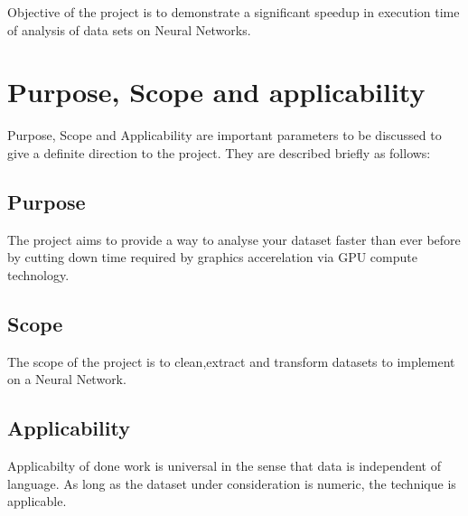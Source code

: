 \hspace{0.9cm} Objective of the project is to demonstrate a significant speedup in execution time of analysis of data sets on Neural Networks.

\section{Purpose, Scope and applicability}

\hspace{0.9cm} Purpose, Scope and Applicability are important parameters to be discussed to give a definite direction to the project. They are described briefly as follows:

\subsection{Purpose}

\hspace{0.9cm} The project aims to provide a way to analyse your dataset faster than ever before by cutting down time required by graphics accerelation via GPU compute technology.

\subsection{Scope}

\hspace{0.9cm} The scope of the project is to clean,extract and transform datasets to implement on a Neural Network.

\subsection{Applicability}

\hspace{0.9cm} Applicabilty of done work is universal in the sense that data is independent of language. As long as the dataset under consideration is numeric, the technique is applicable.

